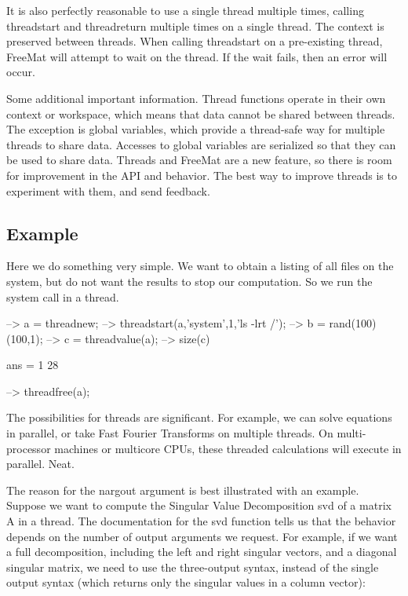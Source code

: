 It is also perfectly reasonable to use a single thread multiple times, calling {\ttfamily threadstart} and {\ttfamily threadreturn} multiple times on a single thread. The context is preserved between threads. When calling {\ttfamily threadstart} on a pre-\/existing thread, Free\-Mat will attempt to wait on the thread. If the wait fails, then an error will occur.

Some additional important information. Thread functions operate in their own context or workspace, which means that data cannot be shared between threads. The exception is {\ttfamily global} variables, which provide a thread-\/safe way for multiple threads to share data. Accesses to global variables are serialized so that they can be used to share data. Threads and Free\-Mat are a new feature, so there is room for improvement in the A\-P\-I and behavior. The best way to improve threads is to experiment with them, and send feedback.\hypertarget{variables_struct_Example}{}\subsection{Example}\label{variables_struct_Example}
Here we do something very simple. We want to obtain a listing of all files on the system, but do not want the results to stop our computation. So we run the {\ttfamily system} call in a thread.


\begin{DoxyVerbInclude}
--> a = threadnew;                         %
--> threadstart(a,'system',1,'ls -lrt /'); %
--> b = rand(100)\rand(100,1);             %
--> c = threadvalue(a);                    %
--> size(c)                                %

ans = 
  1 28 

--> threadfree(a);
\end{DoxyVerbInclude}


The possibilities for threads are significant. For example, we can solve equations in parallel, or take Fast Fourier Transforms on multiple threads. On multi-\/processor machines or multicore C\-P\-Us, these threaded calculations will execute in parallel. Neat.

The reason for the {\ttfamily nargout} argument is best illustrated with an example. Suppose we want to compute the Singular Value Decomposition {\ttfamily svd} of a matrix {\ttfamily A} in a thread. The documentation for the {\ttfamily svd} function tells us that the behavior depends on the number of output arguments we request. For example, if we want a full decomposition, including the left and right singular vectors, and a diagonal singular matrix, we need to use the three-\/output syntax, instead of the single output syntax (which returns only the singular values in a column vector)\-:


